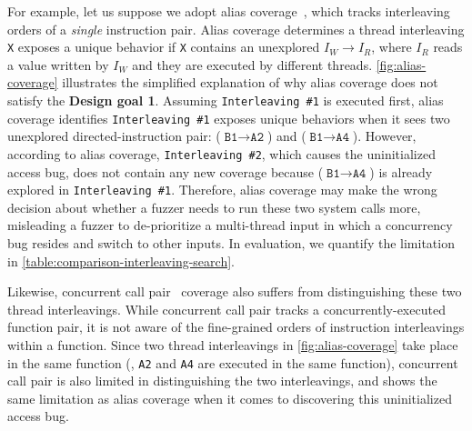For example, let us suppose we adopt alias coverage~\cite{krace},
which tracks interleaving orders of a \textit{single} instruction
pair.
%
Alias coverage determines a thread interleaving \texttt{X} exposes a
unique behavior if \texttt{X} contains an unexplored
 $I_W \rightarrow I_R$, where $I_R$
reads a value written by $I_W$ and they are executed by different
threads.  \autoref{fig:alias-coverage} illustrates the simplified
explanation of why alias coverage does not satisfy the \textbf{Design
  goal 1}.
%
Assuming \texttt{Interleaving \#1} is executed first, alias coverage
identifies \texttt{Interleaving \#1} exposes unique behaviors when it
sees two unexplored directed-instruction pair:
($\texttt{B1} \rightarrow \texttt{A2}$) and
($\texttt{B1} \rightarrow \texttt{A4}$).
%
However, according to alias coverage, \texttt{Interleaving \#2}, which
causes the uninitialized access bug, does not contain any new coverage
because ($\texttt{B1} \rightarrow \texttt{A4}$) is already explored in
\texttt{Interleaving \#1}.
%
Therefore, alias coverage may make the wrong decision about whether a
fuzzer needs to run these two system calls more, misleading a fuzzer
to de-prioritize a multi-thread input in which a concurrency bug
resides and switch to other inputs. In evaluation, we quantify the
limitation in \autoref{table:comparison-interleaving-search}.

Likewise, concurrent call pair~\cite{conzzer} coverage also suffers from
distinguishing these two thread interleavings.
%
While concurrent call pair tracks a concurrently-executed function
pair, it is not aware of the fine-grained orders of instruction interleavings within a function.
%
Since two thread interleavings in \autoref{fig:alias-coverage} take
place in the same function (\ie, \texttt{A2} and \texttt{A4} are
executed in the same function), concurrent call pair is also limited
in distinguishing the two interleavings, and shows the same limitation
as alias coverage when it comes to discovering this uninitialized
access bug.


